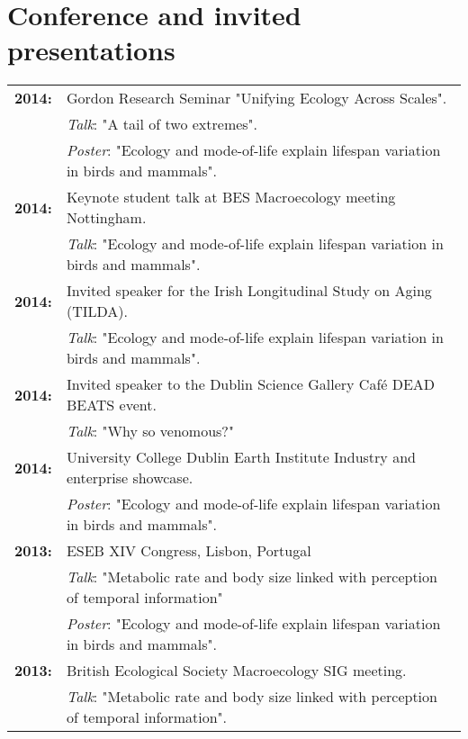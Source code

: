 \documentclass[10pt,a4paper]{article}
\begin{document}
\bigskip



\section{Conference and invited presentations}

\raggedright
\begin{tabular}{ll}
\textbf{2014:} & Gordon Research Seminar "Unifying Ecology Across Scales".\\ 
& \textsl{Talk}: "A tail of two extremes".\\
&\textsl{Poster}: "Ecology and mode-of-life explain lifespan variation in birds and mammals".\\
\textbf{2014:} & Keynote student talk at BES Macroecology meeting Nottingham.\\ 
& \textsl{Talk}: "Ecology and mode-of-life explain lifespan variation in birds and mammals".\\
\textbf{2014:} & Invited speaker for the Irish Longitudinal Study on Aging (TILDA).\\ 
& \textsl{Talk}: "Ecology and mode-of-life explain lifespan variation in birds and mammals".\\
\textbf{2014:} & Invited speaker to the Dublin Science Gallery Café DEAD BEATS event.\\ 
& \textsl{Talk}: "Why so venomous?"\\
\textbf{2014:} & University College Dublin Earth Institute Industry and enterprise showcase.\\
&\textsl{Poster}: "Ecology and mode-of-life explain lifespan variation in birds and mammals".\\
\textbf{2013:} & ESEB XIV Congress, Lisbon, Portugal\\
&\textsl{Talk}: "Metabolic rate and body size linked with perception of temporal information"\\
& \textsl{Poster}: "Ecology and mode-of-life explain lifespan variation in birds and mammals".\\
\textbf{2013:} & British Ecological Society Macroecology SIG meeting.\\
&\textsl{Talk}: "Metabolic rate and body size linked with perception of temporal information".\\

\end{tabular}
\end{document}
